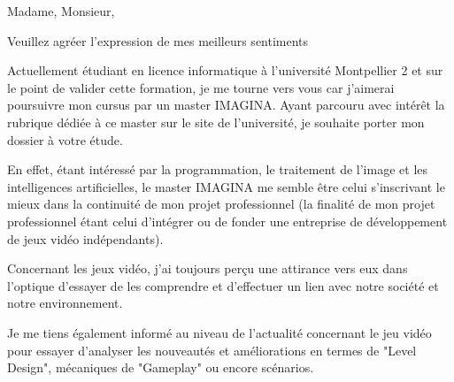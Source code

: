 \documentclass[11pt,a4paper,sans]{moderncv}
\begin{document}
\date{9 Décembre 2014}
\opening{Madame, Monsieur,}
\closing{Veuillez agréer l'expression de mes meilleurs sentiments}
\makelettertitle

Actuellement étudiant en licence informatique à l'université Montpellier 2 et sur le point de valider cette formation, je me tourne vers vous car j'aimerai poursuivre mon cursus par un master IMAGINA. Ayant parcouru avec intérêt la rubrique dédiée à ce master sur le site de l'université, je souhaite porter mon dossier à votre étude.

En effet, étant intéressé par la programmation, le traitement de l'image et les intelligences artificielles, le master IMAGINA me semble être celui s'inscrivant le mieux dans la continuité de mon projet professionnel (la finalité de mon projet professionnel étant celui d'intégrer ou de fonder une entreprise de développement de jeux vidéo indépendants).

Concernant les jeux vidéo, j'ai toujours perçu une attirance vers eux dans l'optique d'essayer de les comprendre et d'effectuer un lien avec notre société et notre environnement.

Je me tiens également informé au niveau de l'actualité concernant le jeu vidéo pour essayer d'analyser les nouveautés et améliorations en termes de "Level Design", mécaniques de "Gameplay" ou encore scénarios.

\makeletterclosing
\end{document}
